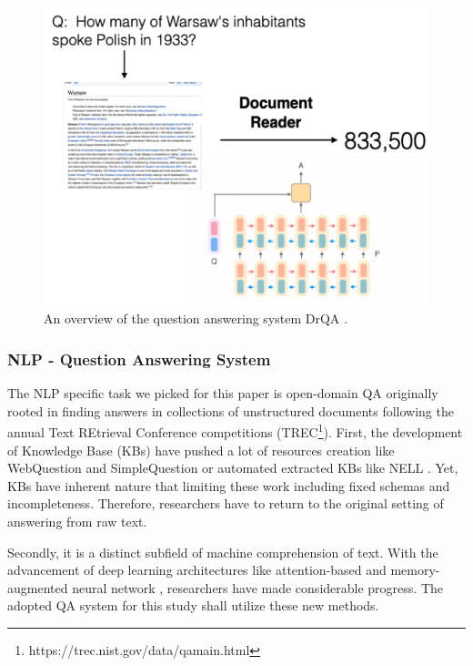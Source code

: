 \begin{figure}[!t]
    \centering
    \includegraphics[width=\linewidth]{img/QA.png}
    \caption{An overview of the question answering system DrQA \cite{DrQA}.}
    \label{fig:DrQA_overview}
    \vspace{-10pt}
\end{figure}



\subsubsection{NLP - Question Answering System}

The NLP specific task we picked for this paper is open-domain QA originally rooted in finding answers in collections of unstructured documents following the annual Text REtrieval Conference competitions (TREC\footnote{https://trec.nist.gov/data/qamain.html}). First, the development of Knowledge Base (KBs) have pushed a lot of resources creation like WebQuestion \cite{webquestion} and SimpleQuestion \cite{simplequestion} or automated extracted KBs like NELL \cite{KBNELL}. Yet, KBs have inherent nature that limiting these work including fixed schemas and incompleteness. Therefore, researchers have to return to the original setting of answering from raw text. 



Secondly, it is a distinct subfield of machine comprehension of text. With the advancement of deep learning architectures like attention-based and memory-augmented neural network \cite{attention} \cite{attention2} \cite{attention3}, researchers have made considerable progress.  The adopted QA system  for this study shall utilize these new methods.


